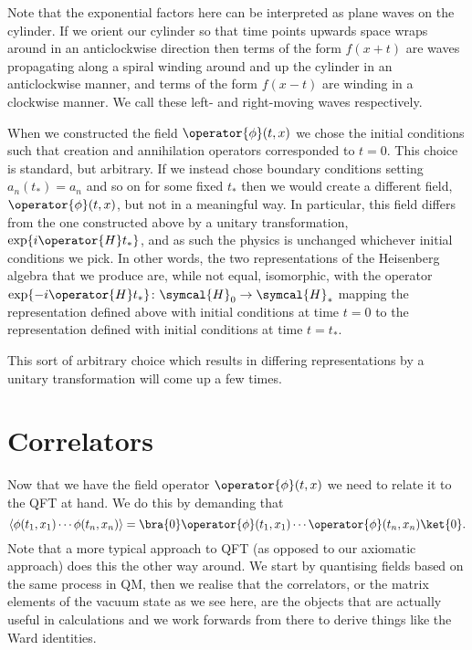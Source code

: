 \documentclass[fleqn]{NotesClass}
\DeclarePairedDelimiter{\correlator}{\langle}{\rangle}
\newcommand{\hilbertSpace}{\symcal{H}}
\begin{document}
    Note that the exponential factors here can be interpreted as plane waves on the cylinder.
    If we orient our cylinder so that time points upwards space wraps around in an anticlockwise direction then terms of the form \(f(x + t)\) are waves propagating along a spiral winding around and up the cylinder in an anticlockwise manner, and terms of the form \(f(x - t)\) are winding in a clockwise manner.
    We call these left- and right-moving waves respectively.
    
    \begin{remark}{}{}
        When we constructed the field \(\operator{\phi}(t, x)\) we chose the initial conditions such that creation and annihilation operators corresponded to \(t = 0\).
        This choice is standard, but arbitrary.
        If we instead chose boundary conditions setting \(a_n(t_*) = a_n\) and so on for some fixed \(t_*\) then we would create a different field, \(\operator{\phi}(t, x)\), but not in a meaningful way.
        In particular, this field differs from the one constructed above by a unitary transformation, \(\exp\{i\operator{H}t_*\}\), and as such the physics is unchanged whichever initial conditions we pick.
        In other words, the two representations of the Heisenberg algebra that we produce are, while not equal, isomorphic, with the operator \(\exp\{-i\operator{H}t_*\} \colon \hilbertSpace_0 \to \hilbertSpace_*\) mapping the representation defined above with initial conditions at time \(t = 0\) to the representation defined with initial conditions at time \(t = t_*\).
        
        This sort of arbitrary choice which results in differing representations by a unitary transformation will come up a few times.
    \end{remark}
    
    \section{Correlators}
    Now that we have the field operator \(\operator{\phi}(t, x)\) we need to relate it to the QFT at hand.
    We do this by demanding that
    \begin{equation}
        \correlator{\phi(t_1, x_1) \dotsm \phi(t_n, x_n)} = \bra{0} \operator{\phi}(t_1, x_1) \dotsm \operator{\phi}(t_n, x_n) \ket{0}.
    \end{equation}
    Note that a more typical approach to QFT (as opposed to our axiomatic approach) does this the other way around.
    We start by quantising fields based on the same process in QM, then we realise that the correlators, or the matrix elements of the vacuum state as we see here, are the objects that are actually useful in calculations and we work forwards from there to derive things like the Ward identities.
    
\end{document}
